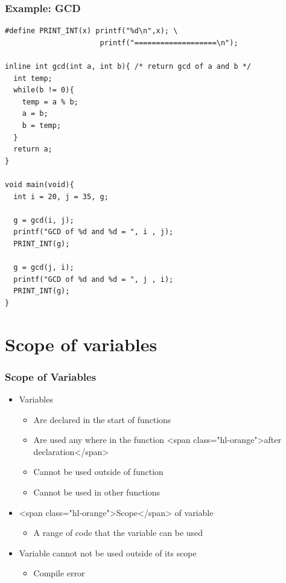 \documentclass{../c-lecture}
\begin{document}
\begin{frame}[fragile]
  \frametitle{Example: GCD}
  \begin{verbatim}
#define PRINT_INT(x) printf("%d\n",x); \
                      printf("===================\n");

inline int gcd(int a, int b){ /* return gcd of a and b */
  int temp;
  while(b != 0){
    temp = a % b;
    a = b;
    b = temp;
  }
  return a;
}

void main(void){
  int i = 20, j = 35, g;

  g = gcd(i, j);
  printf("GCD of %d and %d = ", i , j);
  PRINT_INT(g);

  g = gcd(j, i);
  printf("GCD of %d and %d = ", j , i);
  PRINT_INT(g);
}
  \end{verbatim}
\end{frame}

\section{Scope of variables}

\begin{frame}
  \frametitle{Scope of Variables}
  \begin{itemize}
    \item Variables
    \begin{itemize}
      \item Are declared in the start of functions
      \item
        Are used any where in the function
        <span class="hl-orange">after declaration</span>

      \item Cannot be used outside of function
      \item Cannot be used in other functions
    \end{itemize}
    \item <span class="hl-orange">Scope</span> of variable
    \begin{itemize}
      \item A range of code that the variable can be used
    \end{itemize}
    \item Variable cannot not be used outside of its scope
    \begin{itemize}
      \item Compile error
    \end{itemize}
  \end{itemize}
\end{frame}
\end{document}

